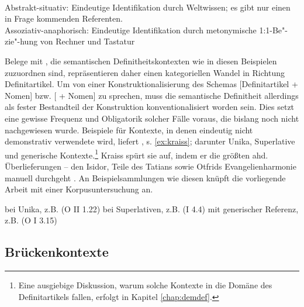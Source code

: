\begin{exe}
	\ex 
	\begin{xlist} \label{ex:sem-def}
		\ex \label{ex:sem-def1}  \\ Abstrakt-situativ: Eindeutige Identifikation durch Weltwissen; es gibt nur einen in Frage kommenden Referenten. 
		\ex \label{ex:sem-def2}   \\ Assoziativ-anaphorisch: Eindeutige Identifikation durch metonymische 1:1-Be"-zie"-hung von Rechner und Tastatur
		\end{xlist}
\end{exe}
\noindent
Belege mit , die semantischen Definitheitskontexten wie in diesen Beispielen zuzuordnen sind, repräsentieren daher einen kategoriellen Wandel in Richtung Definitartikel. Um von einer Konstruktionalisierung des Schemas [Definitartikel + Nomen] bzw. [  + Nomen] zu sprechen, muss die semantische Definitheit allerdings als fester Bestandteil der Konstruktion konventionalisiert worden sein. Dies setzt eine gewisse Frequenz und Obligatorik solcher Fälle voraus, die bislang noch nicht nachgewiesen wurde. Beispiele für Kontexte, in denen  eindeutig nicht demonstrativ verwendete wird, liefert \textcite[135ff.]{Kraiss2014}, s. \ref{ex:kraiss}; darunter Unika, Superlative und generische Kontexte.\footnote{Eine ausgiebige Diskussion, warum solche Kontexte in die Domäne des Definitartikels fallen, erfolgt in Kapitel \ref{chap:demdef}.}  Kraiss spürt sie auf, indem er  die größten ahd. Überlieferungen -- den Isidor, Teile des Tatians sowie Otfrids Evangelienharmonie manuell durchgeht \parencite{Kraiss2012}. An Beispielsammlungen wie diesen \parencite[vgl. z.B. auch][]{Luhr2008,Schlachter2015} knüpft die vorliegende Arbeit mit einer Korpusuntersuchung an. 

\begin{exe}
	\ex 
	\begin{xlist} \label{ex:kraiss}
		\ex \label{ex:kraiss-unika}  bei Unika, z.B.  (O II 1.22) 
		\ex \label{ex:kraiss-superlativ}  bei Superlativen, z.B.  (I 4.4)
				\ex \label{ex:kraiss-generisch}  mit generischer Referenz, z.B.  (O I 3.15)
		\end{xlist}
\end{exe}

\subsection{Brückenkontexte} \label{sec:bruecke}

